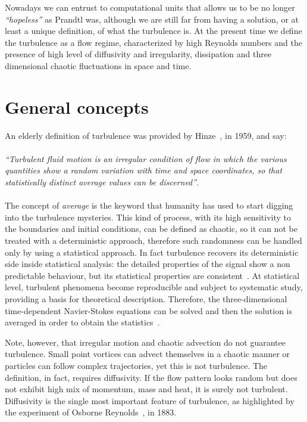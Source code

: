 Nowadays we can entrust to computational units that allows us to be no longer \emph{``hopeless''} as Prandtl was, although we are still far from having a solution, or at least a unique definition, of what the turbulence is. 
At the present time we define the turbulence as a flow regime, characterized by high Reynolds numbers and the presence of high level of diffusivity and irregularity, dissipation and three dimensional chaotic fluctuations in space and time\cite{turbulence:def}.

\section{General concepts}
An elderly definition of turbulence was provided by Hinze~\cite{Hinze}, in 1959, and say:\\~\\
\emph{``Turbulent fluid motion is an irregular condition of flow in which the various quantities show a random variation with time and space coordinates, so that statistically distinct average values can be discerned''}.\\~\\
The concept of \emph{average} is the keyword that humanity has used to start digging into the turbulence mysteries.
This kind of process, with its high sensitivity to the boundaries and initial conditions, can be defined as chaotic, so it can not be treated with a deterministic approach, therefore such randomness can be handled only by using a statistical approach.
In fact turbulence recovers its deterministic side inside statistical analysis: the detailed properties of the signal show a non predictable behaviour, but its statistical properties are consistent~\cite{Frisch}.
At statistical level, turbulent phenomena become reproducible and subject to systematic study, providing a basis for theoretical description. Therefore, the three-dimensional time-dependent Navier-Stokes equations can be solved and then the solution is averaged in order to obtain the statistics~\cite{Durbin}. 
\par
Note, however, that irregular motion and chaotic advection do not guarantee turbulence. Small point vortices can advect themselves in a chaotic manner or particles can follow complex trajectories, yet this is not turbulence. The definition, in fact, requires diffusivity. If the flow pattern looks random but does not exhibit high mix of momentum, mass and heat, it is surely not turbulent. Diffusivity is the single most important feature of turbulence, as highlighted by the experiment of Osborne Reynolds~\cite{Reynolds}, in 1883.
